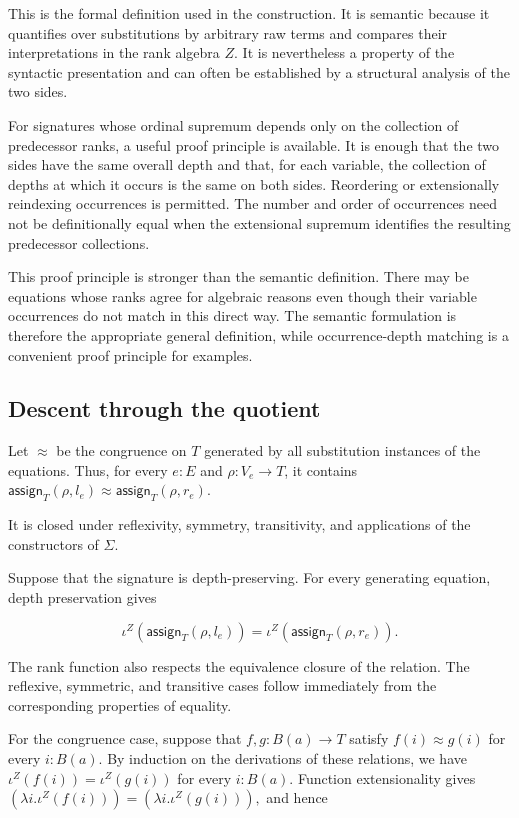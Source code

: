 \documentclass[runningheads]{llncs}
\begin{document}
This is the formal definition used in the construction. It is semantic
because it quantifies over substitutions by arbitrary raw terms and
compares their interpretations in the rank algebra \(Z\). It is
nevertheless a property of the syntactic presentation and can often be
established by a structural analysis of the two sides.

For signatures whose ordinal supremum depends only on the collection of
predecessor ranks, a useful proof principle is available. It is
enough that the two sides have the same overall depth and that, for each
variable, the collection of depths at which it occurs is the same on
both sides. Reordering or extensionally reindexing occurrences is
permitted. The number and order of occurrences need not be
definitionally equal when the extensional supremum identifies the
resulting predecessor collections.

This proof principle is stronger than the semantic definition. There
may be equations whose ranks agree for algebraic reasons even though
their variable occurrences do not match in this direct way. The semantic
formulation is therefore the appropriate general definition, while
occurrence-depth matching is a convenient proof principle for examples.

\subsection{Descent through the
quotient}\label{descent-through-the-quotient}

Let \(\approx\) be the congruence on \(T\) generated by all substitution
instances of the equations. Thus, for every \(e:E\) and
\(\rho:V_e\to T\), it contains
\(\mathsf{assign}_T (\rho,l_e) \approx \mathsf{assign}_T (\rho,r_e).\)

It is closed under reflexivity, symmetry, transitivity, and applications
of the constructors of \(\Sigma\).

Suppose that the signature is depth-preserving. For every generating
equation, depth preservation gives

\[
\iota^Z (\mathsf{assign}_T (\rho,l_e))
=
\iota^Z (\mathsf{assign}_T (\rho,r_e)).
\]

The rank function also respects the equivalence closure of the relation.
The reflexive, symmetric, and transitive cases follow immediately from
the corresponding properties of equality.

For the congruence case, suppose that \(f,g:B (a)\to T\) satisfy
\(f (i)\approx g (i)\) for every \(i:B (a)\). By induction on the
derivations of these relations, we have
\(\iota^Z (f (i)) = \iota^Z (g (i))\) for every \(i:B (a)\). Function
extensionality gives
\((\lambda i.\iota^Z (f (i))) = (\lambda i.\iota^Z (g (i))),\) and hence
\end{document}
